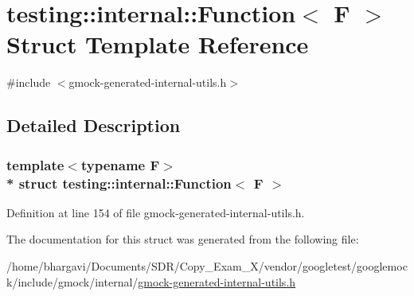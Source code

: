\hypertarget{structtesting_1_1internal_1_1_function}{}\section{testing\+:\+:internal\+:\+:Function$<$ F $>$ Struct Template Reference}
\label{structtesting_1_1internal_1_1_function}


{\ttfamily \#include $<$gmock-\/generated-\/internal-\/utils.\+h$>$}



\subsection{Detailed Description}
\subsubsection*{template$<$typename F$>$\\*
struct testing\+::internal\+::\+Function$<$ F $>$}



Definition at line 154 of file gmock-\/generated-\/internal-\/utils.\+h.



The documentation for this struct was generated from the following file\+:\begin{DoxyCompactItemize}
\item 
/home/bhargavi/\+Documents/\+S\+D\+R/\+Copy\+\_\+\+Exam\+\_\+X/vendor/googletest/googlemock/include/gmock/internal/\hyperlink{gmock-generated-internal-utils_8h}{gmock-\/generated-\/internal-\/utils.\+h}\end{DoxyCompactItemize}
